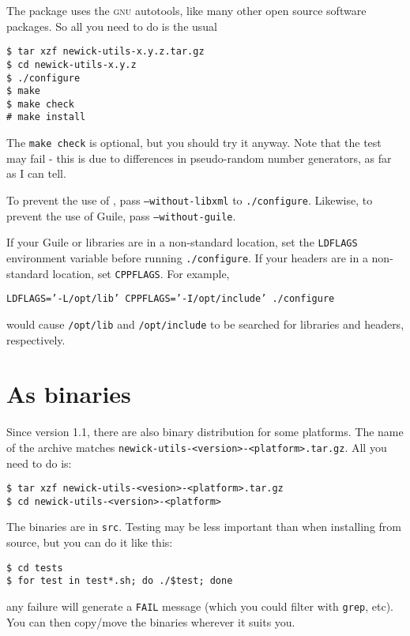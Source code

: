\noindent{}The package uses the \textsc{gnu} autotools, like many other open source software packages. So all you need to do is the usual
\begin{verbatim}
$ tar xzf newick-utils-x.y.z.tar.gz
$ cd newick-utils-x.y.z
$ ./configure
$ make
$ make check
# make install
\end{verbatim}
The \texttt{make check} is optional, but you should try it anyway. Note that
the \gen{} test may fail - this is due to differences in pseudo-random number
generators, as far as I can tell.

\noindent{}To prevent the use of \libxml, pass \texttt{--without-libxml} to
\texttt{./configure}. Likewise, to prevent the use of Guile, pass
\texttt{--without-guile}. 

If your Guile or \libxml{} libraries are in a non-standard location, set the
\texttt{LDFLAGS} environment variable before running \texttt{./configure}. If
your headers are in a non-standard location, set \texttt{CPPFLAGS}. For example,

\texttt{LDFLAGS='-L/opt/lib' CPPFLAGS='-I/opt/include' ./configure}

would cause \texttt{/opt/lib} and \texttt{/opt/include} to be searched for
libraries and headers, respectively.

\section{As binaries}

Since version 1.1, there are also binary distribution for some platforms. The
name of the archive matches \texttt{newick-utils-<version>-<platform>.tar.gz}.
All you need to do is:

\begin{verbatim}
$ tar xzf newick-utils-<vesion>-<platform>.tar.gz
$ cd newick-utils-<version>-<platform>
\end{verbatim}

\noindent{}The binaries are in \texttt{src}. Testing may be less important than
when installing from source, but you can do it like this:

\begin{verbatim}
$ cd tests
$ for test in test*.sh; do ./$test; done 
\end{verbatim}

\noindent{}any failure will generate a \texttt{FAIL} message (which you could filter with \texttt{grep}, etc).  You can then copy/move the binaries wherever it suits you.

